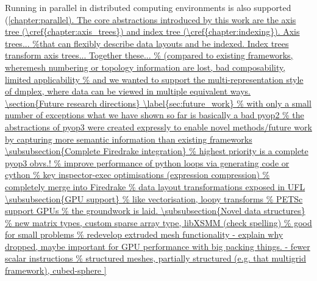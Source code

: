 \documentclass[thesis]{subfiles}
\begin{document}
Running in parallel in distributed computing environments is also supported (\cref{chapter:parallel).

The core abstractions introduced by this work are the axis tree (\cref{chapter:axis_trees}) and index tree (\cref{chapter:indexing}).
Axis trees... %
Index trees transform axis trees...
Together these...

\section{Future research directions}
\label{sec:future_work}


\subsubsection{Complete Firedrake integration}



\subsubsection{GPU support}


\subsubsection{Novel data structures}



}
\end{document}
